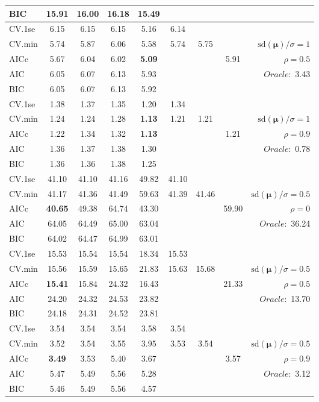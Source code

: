 \begin{table}
\begin{center}
\begin{tabular}{l*{7}{c}|r}
BIC & 15.91 & 16.00 & 16.18 & 15.49 & & & &  \\
 \hline 
CV.1se & 6.15 & 6.15 & 6.15 & 5.16 & 6.14 & & & \\
CV.min & 5.74 & 5.87 & 6.06 & 5.58 & 5.74 & 5.75 & & $\mathrm{sd}(\mathbf{\mu})/\sigma=1$ \\
AICc & 5.67 & 6.04 & 6.02 & {\bf 5.09} & & & 5.91 &  $\rho=0.5$ \\
AIC & 6.05 & 6.07 & 6.13 & 5.93 & & & &  \multirow{2}{*}{$Oracle: $ 3.43} \\
BIC & 6.05 & 6.07 & 6.13 & 5.92 & & & &  \\
 \hline 
CV.1se & 1.38 & 1.37 & 1.35 & 1.20 & 1.34 & & & \\
CV.min & 1.24 & 1.24 & 1.28 & {\bf 1.13} & 1.21 & 1.21 & & $\mathrm{sd}(\mathbf{\mu})/\sigma=1$ \\
AICc & 1.22 & 1.34 & 1.32 & {\bf 1.13} & & & 1.21 &  $\rho=0.9$ \\
AIC & 1.36 & 1.37 & 1.38 & 1.30 & & & &  \multirow{2}{*}{$Oracle: $ 0.78} \\
BIC & 1.36 & 1.36 & 1.38 & 1.25 & & & &  \\
 \hline 
CV.1se & 41.10 & 41.10 & 41.16 & 49.82 & 41.10 & & & \\
CV.min & 41.17 & 41.36 & 41.49 & 59.63 & 41.39 & 41.46 & & $\mathrm{sd}(\mathbf{\mu})/\sigma=0.5$ \\
AICc & {\bf 40.65} & 49.38 & 64.74 & 43.30 & & & 59.90 &  $\rho=0$ \\
AIC & 64.05 & 64.49 & 65.00 & 63.04 & & & &  \multirow{2}{*}{$Oracle: $ 36.24} \\
BIC & 64.02 & 64.47 & 64.99 & 63.01 & & & &  \\
 \hline 
CV.1se & 15.53 & 15.54 & 15.54 & 18.34 & 15.53 & & & \\
CV.min & 15.56 & 15.59 & 15.65 & 21.83 & 15.63 & 15.68 & & $\mathrm{sd}(\mathbf{\mu})/\sigma=0.5$ \\
AICc & {\bf 15.41} & 15.84 & 24.32 & 16.43 & & & 21.33 &  $\rho=0.5$ \\
AIC & 24.20 & 24.32 & 24.53 & 23.82 & & & &  \multirow{2}{*}{$Oracle: $ 13.70} \\
BIC & 24.18 & 24.31 & 24.52 & 23.81 & & & &  \\
 \hline 
CV.1se & 3.54 & 3.54 & 3.54 & 3.58 & 3.54 & & & \\
CV.min & 3.52 & 3.54 & 3.55 & 3.95 & 3.53 & 3.54 & & $\mathrm{sd}(\mathbf{\mu})/\sigma=0.5$ \\
AICc & {\bf 3.49} & 3.53 & 5.40 & 3.67 & & & 3.57 &  $\rho=0.9$ \\
AIC & 5.47 & 5.49 & 5.56 & 5.28 & & & &  \multirow{2}{*}{$Oracle: $ 3.12} \\
BIC & 5.46 & 5.49 & 5.56 & 4.57 & & & &  \\
 \hline 
\end{tabular}
\end{center}
\vspace{-1cm}
\end{table}




